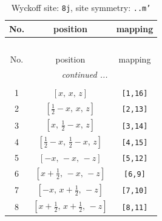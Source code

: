 \documentclass[fleqn,8pt]{jsarticle}
\begin{document}
\begin{longtable}{ccc}
\caption{Wyckoff site: {\tt 8j}, site symmetry: {\tt ..m'}}
 \\
 \hline \hline
No. & position & mapping \\ \hline \endfirsthead

\multicolumn{2}{l}{\tablename\ \thetable{}} \\
 \hline \hline
No. & position & mapping \\ \hline \endhead

 \hline \hline
\multicolumn{2}{r}{\footnotesize\it continued ...} \\ \endfoot

 \hline \hline
\multicolumn{2}{r}{} \\ \endlastfoot

1 & $\left[ x,\, x,\, z \right]$ & {\tt [1,16]} \\ \hline
2 & $\left[ \frac{1}{2} - x,\, x,\, z \right]$ & {\tt [2,13]} \\ \hline
3 & $\left[ x,\, \frac{1}{2} - x,\, z \right]$ & {\tt [3,14]} \\ \hline
4 & $\left[ \frac{1}{2} - x,\, \frac{1}{2} - x,\, z \right]$ & {\tt [4,15]} \\ \hline
5 & $\left[ - x,\, - x,\, - z \right]$ & {\tt [5,12]} \\ \hline
6 & $\left[ x + \frac{1}{2},\, - x,\, - z \right]$ & {\tt [6,9]} \\ \hline
7 & $\left[ - x,\, x + \frac{1}{2},\, - z \right]$ & {\tt [7,10]} \\ \hline
8 & $\left[ x + \frac{1}{2},\, x + \frac{1}{2},\, - z \right]$ & {\tt [8,11]} \\
\end{longtable}
\renewcommand{\arraystretch}{1.2}
\end{document}
